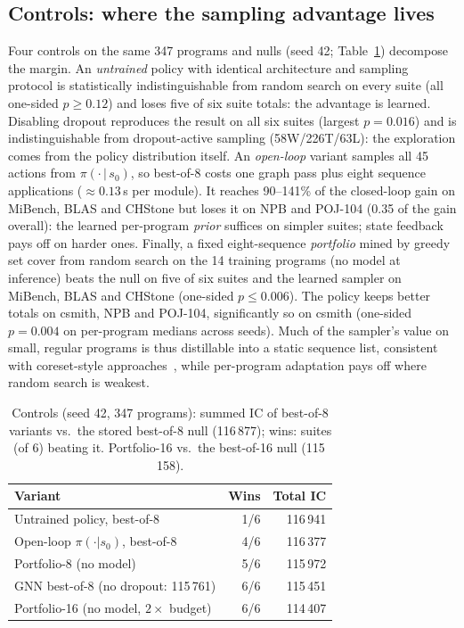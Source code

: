 \documentclass[conference,a4paper]{IEEEtran}
\begin{document}
\subsection{Controls: where the sampling advantage lives}
Four controls on the same 347 programs and nulls (seed 42;
Table~\ref{tab:controls}) decompose the margin. An \emph{untrained}
policy with identical architecture and sampling protocol is
statistically indistinguishable from random search on every suite (all
one-sided $p{\ge}0.12$) and loses five of six suite totals: the
advantage is learned. Disabling dropout reproduces the result on all
six suites (largest $p{=}0.016$) and is indistinguishable from
dropout-active sampling (58W/226T/63L): the exploration comes from the
policy distribution itself. An \emph{open-loop} variant samples all 45 actions from
$\pi(\cdot\,|\,s_0)$, so best-of-8 costs one graph pass plus eight
sequence applications (${\approx}0.13$\,s per module). It reaches
90--141\% of the closed-loop gain on MiBench, BLAS and CHStone but
loses it on NPB and POJ-104 (0.35 of the gain overall): the learned
per-program \emph{prior} suffices on simpler suites; state feedback
pays off on harder ones. Finally, a fixed eight-sequence
\emph{portfolio} mined by greedy set cover from random search on the 14
training programs (no model at inference) beats the null on five of
six suites and the learned sampler on MiBench, BLAS and CHStone
(one-sided $p{\le}0.006$). The policy keeps better totals on csmith,
NPB and POJ-104, significantly so on csmith (one-sided $p{=}0.004$ on
per-program medians across seeds). Much of the sampler's value on
small, regular programs is thus distillable into a static sequence
list, consistent with coreset-style approaches~\cite{coreset}, while
per-program adaptation pays off where random search is weakest.

\begin{table}[t]
\caption{Controls (seed 42, 347 programs): summed IC of best-of-8
variants vs.\ the stored best-of-8 null (116\,877); wins: suites (of
6) beating it. Portfolio-16 vs.\ the best-of-16 null (115\,158).}
\label{tab:controls}
\centering
\footnotesize
\begin{tabular}{lrr}
\toprule
Variant & Wins & Total IC \\
\midrule
Untrained policy, best-of-8 & 1/6 & 116\,941 \\
Open-loop $\pi(\cdot|s_0)$, best-of-8 & 4/6 & 116\,377 \\
Portfolio-8 (no model) & 5/6 & 115\,972 \\
GNN best-of-8 (no dropout: 115\,761) & 6/6 & 115\,451 \\
\midrule
Portfolio-16 (no model, $2{\times}$ budget) & 6/6 & 114\,407 \\
\bottomrule
\end{tabular}
\end{table}
\end{document}
